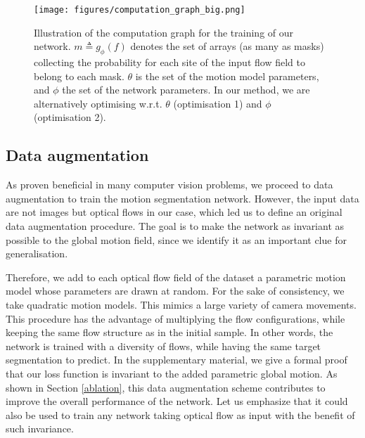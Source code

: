 \documentclass[10pt,twocolumn,letterpaper]{article}
\begin{document}
\begin{figure}[h!]
\texttt{[image: figures/computation\_graph\_big.png]}
\caption{Illustration of the computation graph for the training of our network. $m \triangleq g_{\phi}(f)$ denotes the set of arrays (as many as masks) collecting the probability for each site of the input flow field to belong to each mask. $\theta$ is the set of the motion model parameters, and $\phi$ the set of the network parameters. In our method, we are alternatively optimising w.r.t. $\theta$ (optimisation 1) and $\phi$ (optimisation 2).}
\label{fig:computationgraph}
 \vspace{-0.1cm}
\end{figure}

\subsection{Data augmentation}
\label{augmentation}
As proven beneficial in many computer vision problems, we proceed to data augmentation to train the motion segmentation network. However, the input data are not images but optical flows in our case, which led us to define an original data augmentation procedure. The goal is to make the network as invariant as possible to the global motion field, since we identify it as an important clue for generalisation.

Therefore, we add to each optical flow field of the dataset a parametric motion model whose parameters are drawn at random. For the sake of consistency, we take quadratic motion models. This mimics a large variety of camera movements. This procedure has the advantage of multiplying the flow configurations, while keeping the same flow structure as in the initial sample. In other words, the network is trained with a diversity of flows, while having the same target segmentation to predict. In the supplementary material, we give a formal proof that our loss function is invariant to the added parametric global motion. As shown in Section \ref{ablation}, this data augmentation scheme contributes to improve the overall performance of the network. Let us emphasize that it could also be used to train any network taking optical flow as input with the benefit of such invariance.
\end{document}
